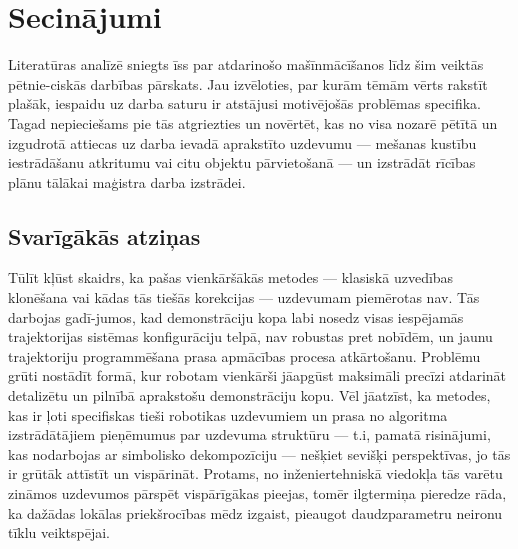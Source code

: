 \documentclass[12pt, a4paper]{article}
\numberwithin{equation}{section} %
\begin{document}
%
%
%
%
%
%
%
%
%
%
%
%
%
%
%
%
%
%
%


\newpage
\section{Secinājumi}

Literatūras analīzē sniegts īss par atdarinošo mašīnmācīšanos līdz šim veiktās pētnie-ciskās darbības pārskats. Jau izvēloties, par kurām tēmām vērts rakstīt plašāk, iespaidu uz darba saturu ir atstājusi motivējošās problēmas specifika. Tagad nepieciešams pie tās atgriezties un novērtēt, kas no visa nozarē pētītā un izgudrotā attiecas uz darba ievadā aprakstīto uzdevumu --- mešanas kustību iestrādāšanu atkritumu vai citu objektu pārvietošanā --- un izstrādāt rīcības plānu tālākai maģistra darba izstrādei.

\subsection{Svarīgākās atziņas}

Tūlīt kļūst skaidrs, ka pašas vienkāršākās metodes --- klasiskā uzvedības klonēšana \cite{pomerleau1989alvinn} vai kādas tās tiešās korekcijas --- uzdevumam piemērotas nav. Tās darbojas gadī-jumos, kad demonstrāciju kopa labi nosedz visas iespējamās trajektorijas sistēmas konfigurāciju telpā, nav robustas pret nobīdēm, un jaunu trajektoriju programmēšana prasa apmācības procesa atkārtošanu. Problēmu grūti nostādīt formā, kur robotam vienkārši jāapgūst maksimāli precīzi atdarināt detalizētu un pilnībā aprakstošu demonstrāciju kopu. Vēl jāatzīst, ka metodes, kas ir ļoti specifiskas tieši robotikas uzdevumiem un prasa no algoritma izstrādātājiem pieņēmumus par uzdevuma struktūru --- t.i, pamatā risinājumi, kas nodarbojas ar simbolisko dekompozīciju \cite{ijspeert2002movement,schaal2003computational, wang2020framework,pastor2011online,pastor2011skill} --- nešķiet sevišķi perspektīvas, jo tās ir grūtāk attīstīt un vispārināt. Protams, no inženiertehniskā viedokļa tās varētu zināmos uzdevumos pārspēt vispārīgākas pieejas, tomēr ilgtermiņa pieredze rāda, ka dažādas lokālas priekšrocības mēdz izgaist, pieaugot daudzparametru neironu tīklu veiktspējai.
\end{document}
